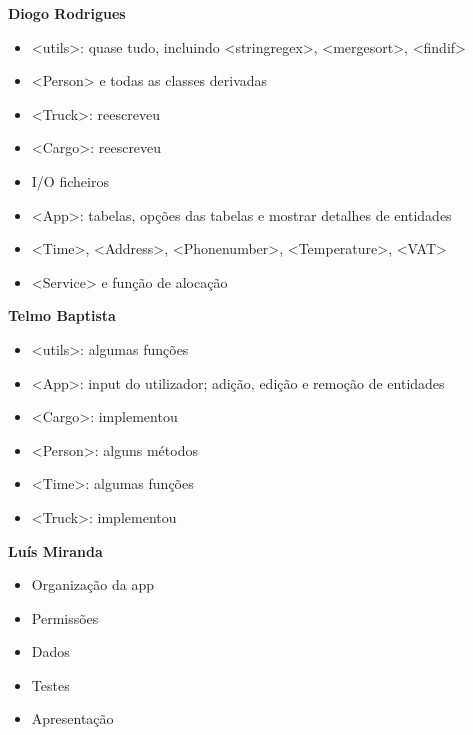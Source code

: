 \documentclass{beamer}
\def\texttt#1{<#1>}
\begin{document}
\begin{frame}
\begin{minipage}[t]{0.33\linewidth}
	\textbf{Diogo Rodrigues}
	{\footnotesize \begin{itemize}
		\item \texttt{utils}: quase tudo, incluindo \texttt{stringregex}, \texttt{mergesort}, \texttt{findif}		
		\item \texttt{Person} e todas as classes derivadas
		\item \texttt{Truck}: reescreveu
		\item \texttt{Cargo}: reescreveu				
		\item I/O ficheiros
		\item \texttt{App}: tabelas, opções das tabelas e mostrar detalhes de entidades
		\item \texttt{Time}, \texttt{Address}, \texttt{Phonenumber}, \texttt{Temperature}, \texttt{VAT}
		\item \texttt{Service} e função de alocação
	\end{itemize} }
\end{minipage}%
\begin{minipage}[t]{0.33\linewidth}
	\textbf{Telmo Baptista}
	{\footnotesize \begin{itemize}
		\item \texttt{utils}: algumas funções
		\item \texttt{App}: input do utilizador; adição, edição e remoção de entidades
		\item \texttt{Cargo}: implementou
		\item \texttt{Person}: alguns métodos
		\item \texttt{Time}: algumas funções
		\item \texttt{Truck}: implementou
	\end{itemize} }
\end{minipage}%
\begin{minipage}[t]{0.33\linewidth}
	\textbf{Luís Miranda}
	{\footnotesize \begin{itemize}
		\item Organização da app
		\item Permissões
		\item Dados
		\item Testes
		\item Apresentação
	\end{itemize} }
\end{minipage}
\end{frame}
\end{document}

